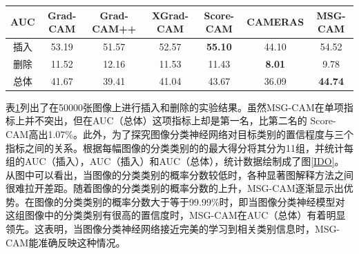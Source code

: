 \begin{table}[!ht]
	\renewcommand{\arraystretch}{1.5}
	\centering
	\wuhao
	\label{auc}
	\begin{tabular}{ccccccc} 
		\toprule[1.5pt]
		AUC & Grad-CAM & Grad-CAM++ & XGrad-CAM & Score-CAM        & CAMERAS       & \textbf{MSG-CAM}  \\ 
		\hline
		插入  & 53.19   & 51.57     & 52.57    & \textbf{55.10}     & 44.10         & 54.52             \\
		删除  & 11.52   & 12.16     & 11.53    & 11.43              & \textbf{8.01} & 9.78              \\
		总体  & 41.67   & 39.41     & 41.04    & 43.67              & 36.09         & \textbf{44.74}    \\
		\bottomrule[1.5pt]
	\end{tabular}
\end{table}
\vspace{-0.3cm}

表\ref{auc}列出了在50000张图像上进行插入和删除的实验结果。虽然MSG-CAM在单项指标上并不突出，但在AUC（总体）这项指标上却是第一名，比第二名的 Score-CAM高出1.07\%。此外，为了探究图像分类神经网络对目标类别的置信程度与三个指标之间的关系。根据每幅图像的分类类别的的最大得分将其分为11组，并统计每组的AUC（插入），AUC（插入）和AUC（总体），统计数据绘制成了图\ref{IDO}。 从图中可以看出，当图像的分类类别的概率分数较低时，各种显著图解释方法之间很难拉开差距。随着图像的分类类别的概率分数的上升，MSG-CAM逐渐显示出优势。在图像的分类类别的概率分数大于等于99.99\%时，即当图像分类神经模型对这组图像中的分类类别有很高的置信度时，MSG-CAM在AUC（总体）有着明显领先。这表明，当图像分类神经网络接近完美的学习到相关类别信息时，MSG-CAM能准确反映这种情况。


